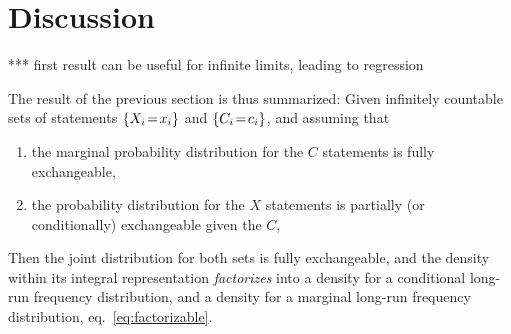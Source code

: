 \documentclass[\ifafour a4paper,12pt,\else a5paper,10pt,\fi%
onecolumn,oneside,article,%
british%
]{memoir}
\makeatletter
\newcommand*{\widefbox}[1]{\fbox{\hspace*{1ex}#1\hspace*{1ex}}}
\theoremstyle{remark}
\theoremstyle{innote}
\def\sum{\DOTSI\sumop\slimits@}
\newcommand*{\de}{\partialup}%
\DeclarePairedDelimiter\set{\{}{\}}
\newcommand*{\p}{\mathrm{P}}%
\renewcommand*{\|}[1][]{\nonscript\,#1\vert\nonscript\,\mathopen{}}
\newcommand*{\sect}{\S}%
\newcommand*{\eqn}{eq.}%
\newcommand*{\tsum}{\mathop{\textstyle\sum}\nolimits}
\renewcommand*{\=}{\TextOrMath\texteq\eq}
\newcommand*{\X}[1]{X_{#1}}
\newcommand*{\x}[1]{x_{#1}}
\newcommand*{\C}[1]{C_{#1}}
\newcommand*{\cc}[1]{c_{#1}}
\makeatother
\begin{document}




\section{Discussion}
\label{sec:discuss}

*** first result can be useful for infinite limits, leading to regression


The result of the previous section is thus summarized: Given infinitely
countable sets of statements $\set{\X{i}\=\x{i}}$ and
$\set{\C{i}\=\cc{i}}$, and assuming that
\begin{enumerate}[wide]
\item the marginal probability distribution for the $C$ statements is fully
  exchangeable,
\item the probability distribution for the $X$ statements is partially (or
  conditionally) exchangeable given the $C$,
\end{enumerate}
Then the joint distribution for both sets is fully exchangeable, and the
density within its integral representation \emph{factorizes} into a density
for a conditional long-run frequency distribution, and a density for a
marginal long-run frequency distribution, \eqn~\eqref{eq:factorizable}.






\end{document}
